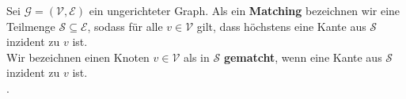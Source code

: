 \begin{definition}[Matching]\label{def:matching}
Sei $\mathcal{G} = (\mathcal{V}, \mathcal{E})$ ein ungerichteter Graph.
Als ein \textbf{Matching} bezeichnen wir eine Teilmenge $\mathcal{S} \subseteq \mathcal{E}$,
sodass für alle $v \in \mathcal{V}$ gilt, dass höchstens eine Kante 
aus $\mathcal{S}$ inzident zu $v$ ist.\\
Wir bezeichnen einen Knoten $v \in \mathcal{V}$ als in $\mathcal{S}$ \textbf{gematcht},
wenn eine Kante aus $\mathcal{S}$ inzident zu $v$ ist.\\\textnormal{\cite[S.~732]{cormen:matchings}}.
\end{definition}
